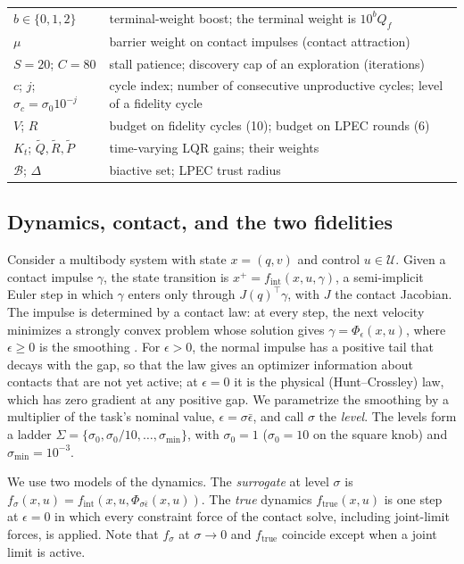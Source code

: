 \documentclass[11pt]{article}
\theoremstyle{remark}
\newcommand{\ftrue}{f_{\mathrm{true}}}
\newcommand{\fint}{f_{\mathrm{int}}}
\newcommand{\epsref}{\bar{\epsilon}}
\newcommand{\smin}{\sigma_{\min}}
\newcommand{\U}{\mathcal{U}}
\newcommand{\B}{\mathcal{B}}
\begin{document}
\begin{table}[t]
\begin{tabularx}{\linewidth}{@{}lX@{}}
$b \in \{0,1,2\}$ & terminal-weight boost; the terminal weight is $10^b Q_f$ \\
$\mu$ & barrier weight on contact impulses (contact attraction) \\
$S = 20$; $C = 80$ & stall patience; discovery cap of an exploration (iterations) \\
$c$; $j$; $\sigma_c = \sigma_0 10^{-j}$ & cycle index; number of consecutive unproductive cycles; level of a fidelity cycle \\
$V$; $R$ & budget on fidelity cycles (10); budget on LPEC rounds (6) \\
$K_t$; $\tilde Q, \tilde R, \tilde P$ & time-varying LQR gains; their weights \\
$\B$; $\Delta$ & biactive set; LPEC trust radius \\
\bottomrule
\end{tabularx}
\end{table}

\subsection{Dynamics, contact, and the two fidelities}

Consider a multibody system with state $x = (q, v)$ and control $u \in \U$. Given a contact impulse $\gamma$, the state transition is $x^+ = \fint(x, u, \gamma)$, a semi-implicit Euler step in which $\gamma$ enters only through $J(q)^\top \gamma$, with $J$ the contact Jacobian. The impulse is determined by a contact law: at every step, the next velocity minimizes a strongly convex problem whose solution gives $\gamma = \Phi_\epsilon(x, u)$, where $\epsilon \geq 0$ is the smoothing \cite{li2027lifted}. For $\epsilon > 0$, the normal impulse has a positive tail that decays with the gap, so that the law gives an optimizer information about contacts that are not yet active; at $\epsilon = 0$ it is the physical (Hunt--Crossley) law, which has zero gradient at any positive gap. We parametrize the smoothing by a multiplier of the task's nominal value, $\epsilon = \sigma \epsref$, and call $\sigma$ the \emph{level}. The levels form a ladder $\Sigma = \{\sigma_0, \sigma_0/10, \dots, \smin\}$, with $\sigma_0 = 1$ ($\sigma_0 = 10$ on the square knob) and $\smin = 10^{-3}$.

We use two models of the dynamics. The \emph{surrogate} at level $\sigma$ is $f_\sigma(x, u) = \fint(x, u, \Phi_{\sigma\epsref}(x, u))$. The \emph{true} dynamics $\ftrue(x, u)$ is one step at $\epsilon = 0$ in which every constraint force of the contact solve, including joint-limit forces, is applied. Note that $f_\sigma$ at $\sigma \to 0$ and $\ftrue$ coincide except when a joint limit is active.
\end{document}
